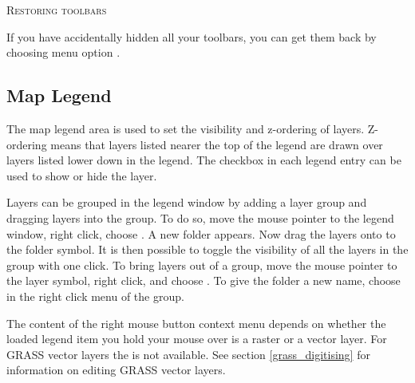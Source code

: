 \begin{Tip}
\caption{\textsc{Restoring toolbars}} 
If you have accidentally hidden all your toolbars, you can get them
back by choosing menu option  \arrow {}.
\end{Tip}

\subsection{Map Legend}\label{label_legend}

The map legend area is used to set the visibility and z-ordering of layers.
Z-ordering means that layers listed nearer the top of the legend are drawn
over layers listed lower down in the legend. The checkbox in each legend
entry can be used to show or hide the layer.

Layers can be grouped in the legend window by adding a layer group and dragging layers
into the group. To do so, move the mouse pointer to the legend window, right click, choose .
A new folder appears. Now drag the layers onto to the folder symbol. It is then possible to toggle the
visibility of all the layers in the group with one click. To bring layers out of a group, move
the mouse pointer to the layer symbol, right click, and choose . To give the folder a
new name, choose  in the right click menu of the group.

The content of the right mouse button context menu depends on whether the loaded legend item you hold your
mouse over is a raster or a vector layer. For GRASS vector layers the  is not
available. See section \ref{grass_digitising} for information on editing GRASS vector layers.

